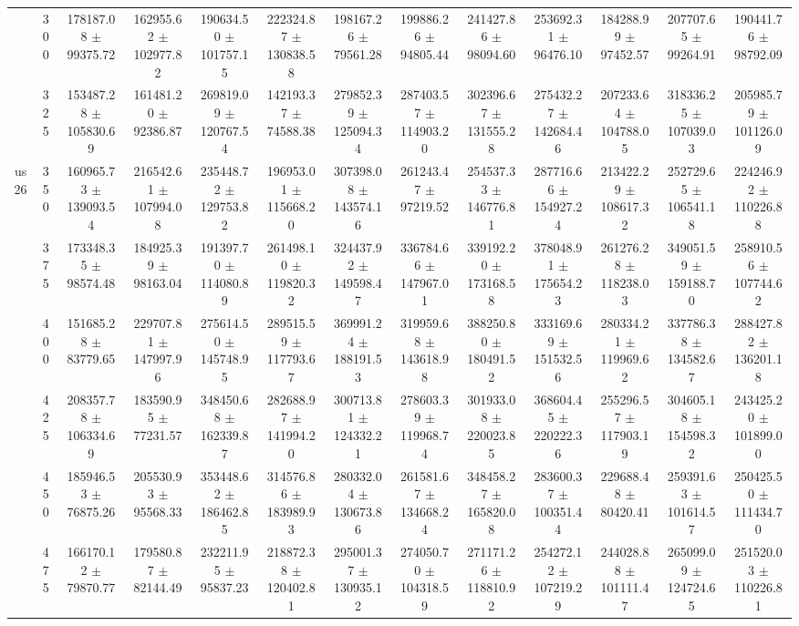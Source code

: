 \begin{table}[h]
{\begin{tabular}{
        ccccccccccccc}
 & 300& 178187.08 $\pm$ 99375.72& 162955.62 $\pm$ 102977.82& 190634.50 $\pm$ 101757.15& 222324.87 $\pm$ 130838.58& 198167.26 $\pm$ 79561.28& 199886.26 $\pm$ 94805.44& 241427.86 $\pm$ 98094.60& 253692.31 $\pm$ 96476.10& 184288.99 $\pm$ 97452.57& 207707.65 $\pm$ 99264.91& 190441.76 $\pm$ 98792.09 \\ 
 & 325& 153487.28 $\pm$ 105830.69& 161481.20 $\pm$ 92386.87& 269819.09 $\pm$ 120767.54& 142193.37 $\pm$ 74588.38& 279852.39 $\pm$ 125094.34& 287403.57 $\pm$ 114903.20& 302396.67 $\pm$ 131555.28& 275432.27 $\pm$ 142684.46& 207233.64 $\pm$ 104788.05& 318336.25 $\pm$ 107039.03& 205985.79 $\pm$ 101126.09 \\ 
\multirow{4}{*}{us26}& 350& 160965.73 $\pm$ 139093.54& 216542.61 $\pm$ 107994.08& 235448.72 $\pm$ 129753.82& 196953.01 $\pm$ 115668.20& 307398.08 $\pm$ 143574.16& 261243.47 $\pm$ 97219.52& 254537.33 $\pm$ 146776.81& 287716.66 $\pm$ 154927.24& 213422.29 $\pm$ 108617.32& 252729.65 $\pm$ 106541.18& 224246.92 $\pm$ 110226.88 \\ 
 & 375& 173348.35 $\pm$ 98574.48& 184925.39 $\pm$ 98163.04& 191397.70 $\pm$ 114080.89& 261498.10 $\pm$ 119820.32& 324437.92 $\pm$ 149598.47& 336784.66 $\pm$ 147967.01& 339192.20 $\pm$ 173168.58& 378048.91 $\pm$ 175654.23& 261276.28 $\pm$ 118238.03& 349051.59 $\pm$ 159188.70& 258910.56 $\pm$ 107744.62 \\ 
 & 400& 151685.28 $\pm$ 83779.65& 229707.81 $\pm$ 147997.96& 275614.50 $\pm$ 145748.95& 289515.59 $\pm$ 117793.67& 369991.24 $\pm$ 188191.53& 319959.68 $\pm$ 143618.98& 388250.80 $\pm$ 180491.52& 333169.69 $\pm$ 151532.56& 280334.21 $\pm$ 119969.62& 337786.38 $\pm$ 134582.67& 288427.82 $\pm$ 136201.18 \\ 
 & 425& 208357.78 $\pm$ 106334.69& 183590.95 $\pm$ 77231.57& 348450.68 $\pm$ 162339.87& 282688.97 $\pm$ 141994.20& 300713.81 $\pm$ 124332.21& 278603.39 $\pm$ 119968.74& 301933.08 $\pm$ 220023.85& 368604.45 $\pm$ 220222.36& 255296.57 $\pm$ 117903.19& 304605.18 $\pm$ 154598.32& 243425.20 $\pm$ 101899.00 \\ 
 & 450& 185946.53 $\pm$ 76875.26& 205530.93 $\pm$ 95568.33& 353448.62 $\pm$ 186462.85& 314576.86 $\pm$ 183989.93& 280332.04 $\pm$ 130673.86& 261581.67 $\pm$ 134668.24& 348458.27 $\pm$ 165820.08& 283600.37 $\pm$ 100351.44& 229688.48 $\pm$ 80420.41& 259391.63 $\pm$ 101614.57& 250425.50 $\pm$ 111434.70 \\ 
 & 475& 166170.12 $\pm$ 79870.77& 179580.87 $\pm$ 82144.49& 232211.95 $\pm$ 95837.23& 218872.38 $\pm$ 120402.81& 295001.37 $\pm$ 130935.12& 274050.70 $\pm$ 104318.59& 271171.26 $\pm$ 118810.92& 254272.12 $\pm$ 107219.29& 244028.88 $\pm$ 101111.47& 265099.09 $\pm$ 124724.65& 251520.03 $\pm$ 110226.81 \\ 

\end{tabular}}
\end{table}
